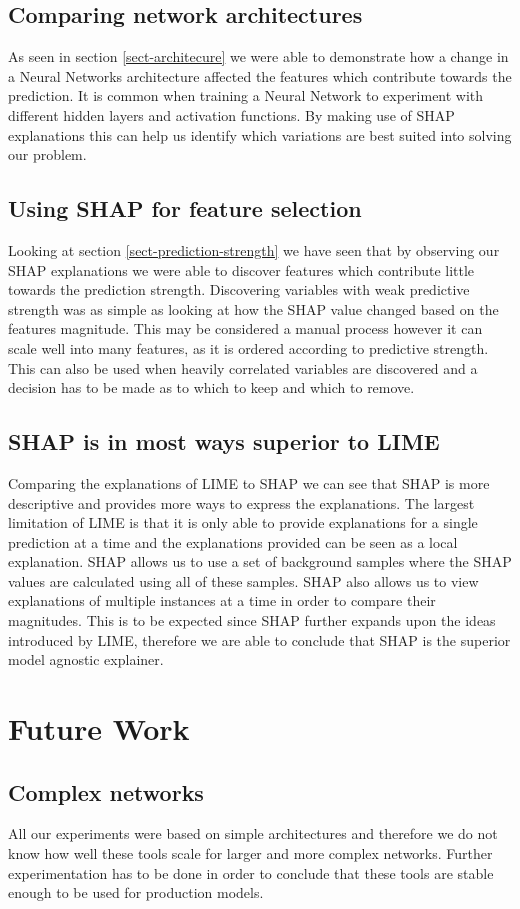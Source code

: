 \subsection{Comparing network architectures}
As seen in section \ref{sect-architecure} we were able to demonstrate how a change in a Neural Networks architecture affected the features which contribute towards the prediction. It is common when training a Neural Network to experiment with different hidden layers and activation functions. By making use of SHAP explanations this can help us identify which variations are best suited into solving our problem.
\subsection{Using SHAP for feature selection}
Looking at section \ref{sect-prediction-strength} we have seen that by observing our SHAP explanations we were able to discover features which contribute little towards the prediction strength. Discovering variables with weak predictive strength was as simple as looking at how the SHAP value changed based on the features magnitude. This may be considered a manual process however it can scale well into many features, as it is ordered according to predictive strength. This can also be used when heavily correlated variables are discovered and a decision has to be made as to which to keep and which to remove.
\subsection{SHAP is in most ways superior to LIME}
Comparing the explanations of LIME to SHAP we can see that SHAP is more descriptive and provides more ways to express the explanations. The largest limitation of LIME is that it is only able to provide explanations for a single prediction at a time and the explanations provided can be seen as a local explanation. SHAP allows us to use a set of background samples where the SHAP values are calculated using all of these samples. SHAP also allows us to view explanations of multiple instances at a time in order to compare their magnitudes. This is to be expected since SHAP further expands upon the ideas introduced by LIME, therefore we are able to conclude that SHAP is the superior model agnostic explainer.
\section{Future Work}
\subsection{Complex networks}
All our experiments were based on simple architectures and therefore we do not know how well these tools scale for larger and more complex networks. Further experimentation has to be done in order to conclude that these tools are stable enough to be used for production models.

